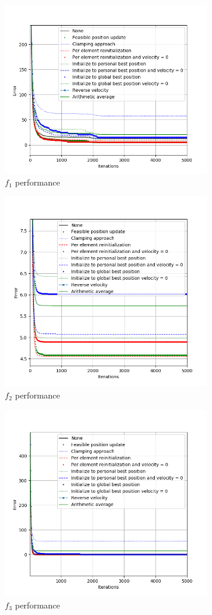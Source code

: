 \documentclass[conference]{IEEEtran}
\begin{document}
\begin{figure}[htbp]
\centerline{\includegraphics[width=90mm]{images/results/AbsoluteValue.png}}
\caption{$f_1$ performance}
\label{fig:absoluteValue}
\end{figure}

\begin{figure}[htbp]
\centerline{\includegraphics[width=90mm]{images/results/Ackley.png}}
\caption{$f_2$ performance}
\label{fig:ackley}
\end{figure}

\begin{figure}[htbp]
\centerline{\includegraphics[width=90mm]{images/results/Hyperellipsoid.png}}
\caption{$f_3$ performance}
\label{fig:hyperellipsoid}
\end{figure}
\end{document}
